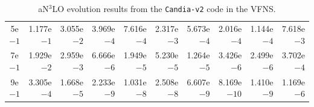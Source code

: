 \begin{table}[htp]
\begin{center}
\begin{tabular}{||c||r|r|r|r|r|r|r|r|r|}
 5e$-1$ &  1.177e$-1$ &  3.055e$-2$ &  3.969e$-4$ &  7.616e$-4$ &  2.317e$-3$ &  5.673e$-4$ &  2.016e$-4$ &  1.144e$-4$ &  7.618e$-3$ \\
 7e$-1$ &  1.929e$-2$ &  2.959e$-3$ &  6.666e$-6$ &  1.949e$-5$ &  5.230e$-5$ &  1.264e$-5$ &  3.426e$-6$ &  2.499e$-6$ &  3.702e$-4$ \\
 9e$-1$ &  3.305e$-4$ &  1.668e$-5$ &  2.233e$-9$ &  1.031e$-8$ &  2.508e$-8$ &  6.607e$-9$ &  8.169e$-10$ &  1.410e$-9$ &  1.169e$-6$ \\
\hline \hline
\end{tabular}
\end{center}
\caption{aN$^3$LO evolution results from the \texttt{Candia-v2} code in the VFNS.}
\label{tab:n3lo_evolution_results}
\end{table}
